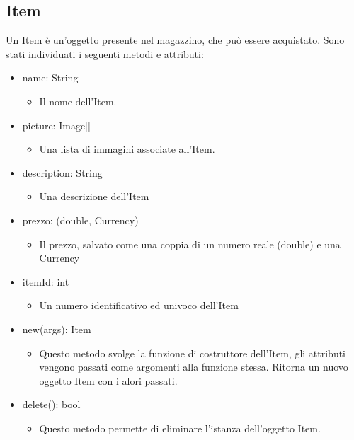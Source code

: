 \documentclass{report}
\begin{document}
\subsection*{Item}
Un Item è un'oggetto presente nel magazzino, che può essere acquistato. Sono stati individuati i seguenti metodi e attributi:

\begin{itemize}

\item name: String
\begin{itemize}
	\item Il nome dell'Item.
\end{itemize}

\item picture: Image[]
\begin{itemize}
	\item Una lista di immagini associate all'Item.
\end{itemize}

\item description: String
\begin{itemize}
	\item Una descrizione dell'Item
\end{itemize}

\item prezzo: (double, Currency)
\begin{itemize}
	\item Il prezzo, salvato come una coppia di un numero reale (double) e una Currency
\end{itemize}

\item  itemId: int
\begin{itemize}
	\item Un numero identificativo ed univoco dell'Item
\end{itemize}

\item  new(args): Item
\begin{itemize}
	\item Questo metodo svolge la funzione di costruttore dell'Item, gli attributi vengono passati come argomenti alla funzione stessa. Ritorna un nuovo oggetto Item con i alori passati.
\end{itemize}

\item  delete(): bool
\begin{itemize}
	\item Questo metodo permette di eliminare l'istanza dell'oggetto Item.
\end{itemize}

\end{itemize}
\end{document}
